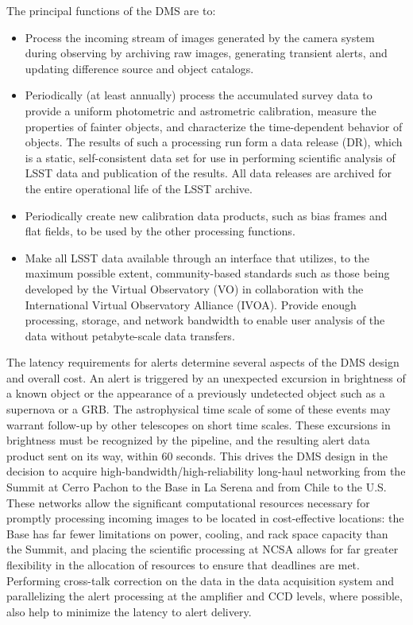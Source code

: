 \documentclass[DM,toc]{lsstdoc}
\begin{document}
The principal functions of the DMS are to:
\begin{itemize}
	\item Process the incoming stream of images generated by the camera system during observing by archiving raw images, generating transient alerts, and updating difference source and object catalogs.
	\item Periodically (at least annually) process the accumulated survey data to provide a uniform photometric and astrometric calibration, measure the properties of fainter objects, and characterize the time-dependent behavior of objects. The results of such a processing run form a data release (DR), which is a static, self-consistent data set for use in performing scientific analysis of LSST data and publication of the results. All data releases are archived for the entire operational life of the LSST archive.
	\item Periodically create new calibration data products, such as bias frames and flat fields, to be used by the other processing functions.
	\item Make all LSST data available through an interface that utilizes, to the maximum possible extent, community-based standards such as those being developed by the Virtual Observatory (VO) in collaboration with the International Virtual Observatory Alliance (IVOA).  Provide enough processing, storage, and network bandwidth to enable user analysis of the data without petabyte-scale data transfers.
\end{itemize}

The latency requirements for alerts determine several aspects of the DMS design
and overall cost.  An alert is triggered by an unexpected excursion in
brightness of a known object or the appearance of a previously undetected
object such as a supernova or a GRB. The astrophysical time scale of some of
these events may warrant follow-up by other telescopes on short time scales.
These excursions in brightness must be recognized by the pipeline, and the
resulting alert data product sent on its way, within 60 seconds. This drives
the DMS design in the decision to acquire high-bandwidth/high-reliability
long-haul networking from the Summit at Cerro Pachon to the Base in La Serena and from Chile to the U.S. These networks allow the significant computational
resources necessary for promptly processing incoming images to be located in
cost-effective locations: the Base has far fewer limitations on power, cooling,
and rack space capacity than the Summit, and placing the scientific
processing at NCSA allows for far greater flexibility in the allocation of
resources to ensure that deadlines are met. Performing cross-talk correction
on the data in the data acquisition system and parallelizing the alert
processing at the amplifier and CCD levels, where possible, also help to
minimize the latency to alert delivery.
\end{document}
